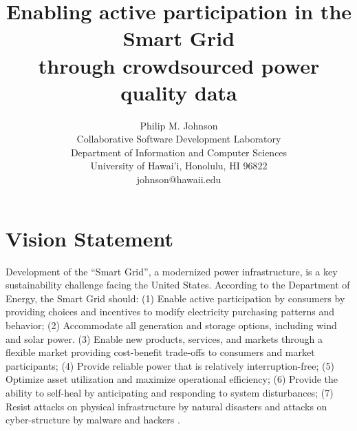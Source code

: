 \documentclass[11pt]{article}
\begin{document}
\title{Enabling active participation in the Smart Grid\\ through crowdsourced power quality data}

\author{Philip M. Johnson \\
      Collaborative Software Development Laboratory \\
      Department of Information and Computer Sciences \\
      University of Hawai'i,  Honolulu, HI 96822 \\
      johnson@hawaii.edu 
}

\maketitle


\tableofcontents
\newpage

\section{Vision Statement}
\label{sec:vision}



Development of the ``Smart Grid'', a modernized power infrastructure, is a key sustainability challenge facing the United States. According to the Department of Energy, the Smart Grid should: (1) Enable active participation by consumers by providing choices and incentives to modify electricity purchasing patterns and behavior; (2) Accommodate all generation and storage options, including wind and solar power.  (3) Enable new products, services, and markets through a flexible market providing cost-benefit trade-offs to consumers and market participants; (4) Provide reliable power that is relatively interruption-free; (5) Optimize asset utilization and maximize operational efficiency; (6) Provide the ability to self-heal by anticipating and responding to system disturbances; (7) Resist attacks on physical infrastructure by natural disasters and attacks on cyber-structure by malware and hackers \cite{NETL:GridCharacteristics}.
\end{document}
